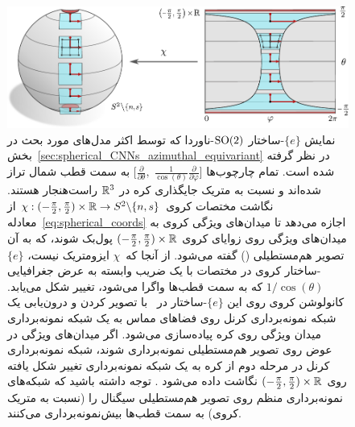 \begin{figure}
    \centering
    \includegraphics[width=.90\textwidth]{figures/G_structure_spherical_equirectangular_1.pdf}
    \caption{\small
        نمایش $\{e\}$-ساختار $\operatorname{SO}(2)$-ناوردا که توسط اکثر مدل‌های مورد بحث در بخش~\ref{sec:spherical_CNNs_azimuthal_equivariant} در نظر گرفته شده است.
        تمام چارچوب‌ها
        $\big[ \frac{\partial}{\partial\theta} ,\; \frac{1}{\cos(\theta)} \frac{\partial}{\partial\varphi} \big]$
        به سمت قطب شمال تراز شده‌اند و نسبت به متریک جایگذاری کره در $\mathbb{R}^3$ راست‌هنجار هستند.
        نگاشت مختصات کروی
        $\chi: (-\frac{\pi}{2}, \frac{\pi}{2}) \times \mathbb{R} \to S^2 \backslash \{n,s\}$ از معادله~\eqref{eq:spherical_coords}
        اجازه می‌دهد تا میدان‌های ویژگی کروی به میدان‌های ویژگی روی زوایای کروی $(-\frac{\pi}{2}, \frac{\pi}{2}) \times \mathbb{R}$ پول‌بک شوند، که به آن تصویر هم‌مستطیلی () گفته می‌شود.
        از آنجا که~$\chi$ ایزومتریک نیست، $\{e\}$-ساختار کروی در مختصات با یک ضریب وابسته به عرض جغرافیایی $1/\cos(\theta)$ که به سمت قطب‌ها واگرا می‌شود، تغییر شکل می‌یابد.
        کانولوشن کروی روی این $\{e\}$-ساختار در~\cite{coors2018spherenet,eder2019convolutions,martin2020panoramic} با تصویر کردن و درون‌یابی یک شبکه نمونه‌برداری کرنل روی فضاهای مماس به یک شبکه نمونه‌برداری میدان ویژگی روی کره پیاده‌سازی می‌شود.
        اگر میدان‌های ویژگی در عوض روی تصویر هم‌مستطیلی نمونه‌برداری شوند، شبکه نمونه‌برداری کرنل در مرحله دوم از کره به یک شبکه نمونه‌برداری تغییر شکل یافته روی $(-\frac{\pi}{2}, \frac{\pi}{2}) \times \mathbb{R}$ نگاشت داده می‌شود \cite{zhao2018distortion,tateno2018distortion}.
        توجه داشته باشید که شبکه‌های نمونه‌برداری منظم روی تصویر هم‌مستطیلی سیگنال را (نسبت به متریک کروی) به سمت قطب‌ها بیش‌نمونه‌برداری می‌کنند.
    }
    \label{fig:spherical_equirectangular_1}
\end{figure}


